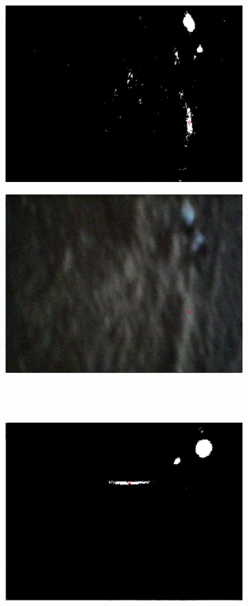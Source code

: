 \begin{figure}
        \centering
        \begin{subfigure}[b]{0.35\textwidth}
                \includegraphics[scale = 0.3]{img/bad1t}
                \caption{}
        \end{subfigure}
		\quad
        \begin{subfigure}[b]{0.35\textwidth}
                \includegraphics[scale = 0.3]{img/bad1}
                \caption{}
        \end{subfigure} \hfill \\ \mbox{}\\
        \begin{subfigure}[b]{0.35\textwidth}
                \includegraphics[scale = 0.3]{img/bad2t}

\end{subfigure}
\end{figure}
